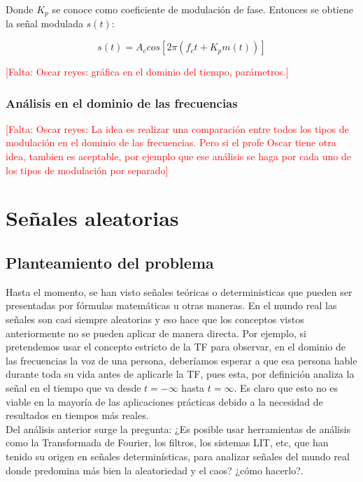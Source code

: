 Donde $K_p$ se conoce como coeficiente de modulación de fase. Entonces se obtiene la señal modulada $s(t)$:

\begin{equation} \label{equ_veintitres}
s(t)=A_c cos[2 \pi (f_c t + K_p m(t))]
\end{equation} 

\textcolor{red}{[Falta: Oscar reyes: gráfica en el dominio del tiempo, parámetros.]}
\subsubsection{Análisis en el dominio de las frecuencias}
\textcolor{red}{[Falta: Oscar reyes: La idea es realizar una comparación entre todos los tipos de modulación en el dominio de las frecuencias. Pero si el profe Oscar tiene otra idea, tambien es aceptable, por ejemplo que ese análisis se haga por cada uno de los tipos de modulación por separado]}

\section{Señales aleatorias}

\subsection{Planteamiento del problema}

Hasta el momento, se han visto señales teóricas o deterministicas que pueden ser presentadas por fórmulas matemáticas u otras maneras. En el mundo real las señales son casi siempre aleatorias y eso hace que los conceptos vistos anteriormente no se pueden aplicar de manera directa. Por ejemplo, si pretendemos usar el concepto estricto de la TF para observar, en el dominio de las frecuencias la voz de una persona, deberíamos esperar a que esa persona hable durante toda su vida antes de aplicarle la TF, pues esta, por definición analiza la señal en el tiempo que va desde $t = -\infty $ hasta $t = \infty $. Es claro que esto no es viable en la mayoría de las aplicaciones prácticas debido a la necesidad de resultados en tiempos más reales.\\

Del análisis anterior surge la pregunta: ¿Es posible usar herramientas de análisis como la Transformada de Fourier, los filtros, los sistemas LIT, etc, que han tenido su origen en señales determinísticas, para analizar señales del mundo real donde predomina más bien la aleatoriedad y el caos? ¿cómo hacerlo?. 

